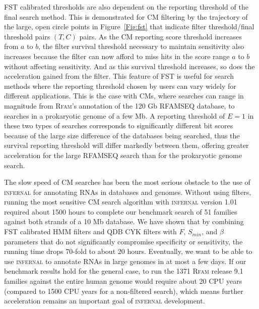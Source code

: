 FST calibrated thresholds are also dependent on the reporting
threshold of the final search method. This is demonstrated for CM
filtering by the trajectory of the large, open circle points in
Figure~\ref{Fig:fst} that indicate filter threshold/final threshold
pairs $(T,C)$ pairs. As the CM reporting score threshold increases
from $a$ to $b$, the filter survival threshold necessary to maintain
sensitivity also increases because the filter can now afford to miss
hits in the score range $a$ to $b$ without affecting sensitivity.  And
as this survival threshold increases, so does the acceleration gained
from the filter.  This feature of FST is useful for search methods
where the reporting threshold chosen by users can vary widely for
different applications.  This is the case with CMs, where searches can
range in magnitude from \textsc{Rfam}'s annotation of
the 120 Gb RFAMSEQ database, to searches in a prokaryotic genome of a
few Mb. A reporting threshold of $E=1$ in these two types of searches
corresponds to significantly different bit scores because of the large
size difference of the databases being searched, thus the survival
reporting threshold will differ markedly between them, offering
greater acceleration for the large RFAMSEQ search than for the
prokaryotic genome search.


The slow speed of CM searches has been the most serious obstacle to
the use of \textsc{infernal} for annotating RNAs in databases and
genomes. Without using filters, running the most sensitive CM search
algorithm with \textsc{infernal} version 1.01 required about 1500
hours to complete our benchmark search of 51 families against both
strands of a 10 Mb database. We have shown that by combining FST
calibrated HMM filters and QDB CYK filters with $F$, $S_{min}$, and
$\beta$ parameters that do not significantly compromise specificity or
sensitivity, the running time drops 70-fold to about 20 hours.
Eventually, we want to be able to use \textsc{infernal} to annotate
RNAs in large genomes in at most a few days. If our benchmark results
hold for the general case, to run the 1371 \textsc{Rfam} release 9.1
families against the entire human genome would require about 20 CPU
years (compared to 1500 CPU years for a non-filtered search), which
means further acceleration remains an important goal of
\textsc{infernal} development.


